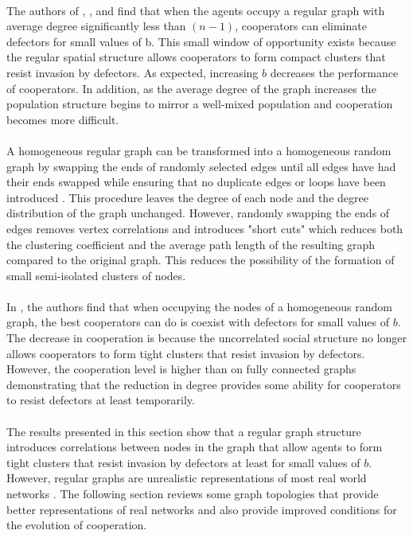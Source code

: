 \documentclass{article}
\begin{document}
    \paragraph{}The authors of \cite{Pacheco2005}, \cite{Santos2006a}, \cite{Santos2006c} and \cite{Santos2005b} find that when the agents occupy a regular graph with average degree significantly less than $(n-1)$, cooperators can eliminate defectors for small values of b.  This small window of opportunity exists because the regular spatial structure allows cooperators to form compact clusters that resist invasion by defectors.  As expected, increasing $b$ decreases the performance of cooperators.  In addition, as the average degree of the graph increases the population structure begins to mirror a well-mixed population and cooperation becomes more difficult.
    \paragraph{}A homogeneous regular graph can be transformed into a homogeneous random graph by swapping the ends of randomly selected edges until all edges have had their ends swapped while ensuring that no duplicate edges or loops have been introduced \cite{Maslov2002}.  This procedure leaves the degree of each node and the degree distribution of the graph unchanged. However, randomly swapping the ends of edges removes vertex correlations and introduces "short cuts" which reduces both the clustering coefficient and the average path length of the resulting graph compared to the original graph.  This reduces the possibility of the formation of small semi-isolated clusters of nodes.
    \paragraph{}In \cite{Santos2006c}, the authors find that when occupying the nodes of a homogeneous random graph, the best cooperators can do is coexist with defectors for small values of $b$.  The decrease in cooperation is because the uncorrelated social structure no longer allows cooperators to form tight clusters that resist invasion by defectors.  However, the cooperation level is higher than on fully connected graphs demonstrating that the reduction in degree provides some ability for cooperators to resist defectors at least temporarily.
    \paragraph{} The results presented in this section show that a regular graph structure introduces correlations between nodes in the graph that allow agents to form tight clusters that resist invasion by defectors at least for small values of $b$.  However, regular graphs are unrealistic representations of most real world networks \cite{Pacheco2005}.  The following section reviews some graph topologies that provide better representations of real networks and also provide improved conditions for the evolution of cooperation.
\end{document}
